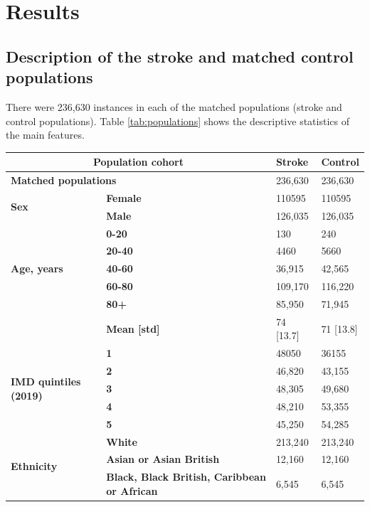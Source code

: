 \section{Results}

\subsection{Description of the stroke and matched control populations}

There were 236,630 instances in each of the matched populations (stroke and control populations). Table \ref{tab:populations} shows the descriptive statistics of the main features.

\begin{table}[!ht]
    \centering
    \begin{tabular}{|l|l|l|l|}
    \hline
        \multicolumn{2}{|c|}{\bf Population cohort} & \bf Stroke & \bf Control \\ \hline
        \multicolumn{2}{|l|}{\bf Matched populations} & 236,630 & 236,630 \\ \hline
        \multirow{2}{*}{\bf Sex} & \bf Female & 110595 & 110595 \\
        & \bf Male & 126,035 & 126,035 \\ \hline
        \multirow{5}{*}{\bf Age, years} & \bf 0-20 & 130 & 240 \\
        & \bf 20-40 & 4460 & 5660 \\
        & \bf 40-60 & 36,915 & 42,565 \\
        & \bf 60-80 & 109,170 & 116,220 \\
        & \bf 80+ & 85,950 & 71,945 \\
        & \bf Mean [std] & 74 [13.7] & 71 [13.8] \\ \hline
        \multirow{5}{*}{\bf IMD quintiles (2019)} & \bf 1 & 48050 & 36155 \\
        & \bf 2 & 46,820 & 43,155 \\
        & \bf 3 & 48,305 & 49,680 \\
        & \bf 4 & 48,210 & 53,355 \\
        & \bf 5 & 45,250 & 54,285 \\ \hline
        \multirow{5}{*}{\bf Ethnicity} & \bf White & 213,240 & 213,240 \\
        & \bf Asian or Asian British & 12,160 & 12,160 \\
        & \bf Black, Black British, Caribbean or African & 6,545 & 6,545 \\

\end{tabular}
\end{table}

